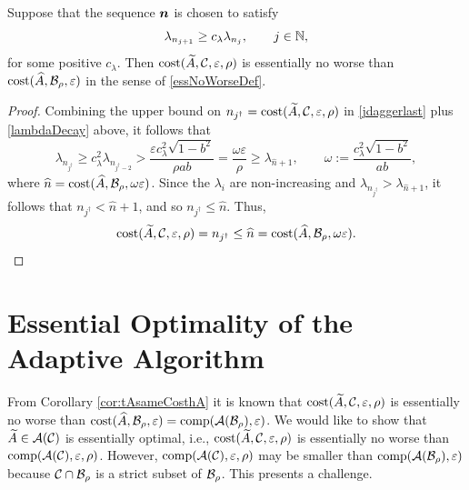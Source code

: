 \documentclass[graybox,footinfo]{svmult}
\begin{document}
\begin{corollary} \label{cor:tAsameCosthA} Suppose that the sequence ${\boldsymbol{n}}$ is chosen to satisfy
\begin{equation} \label{lambdaDecay}
\lambda_{n_{j+1}} \ge c_\lambda \lambda_{n_j}, \qquad j \in \bbN, 
\end{equation}
for some positive $c_\lambda$.  Then $\textup{cost}(\widetilde{A},{\mathcal{C}}, \varepsilon,\rho)$ is essentially no worse than \linebreak[4]
$\textup{cost}(\widehat{A},{\mathcal{B}}_{\rho},\varepsilon)$ in the sense of \eqref{essNoWorseDef}. 
\end{corollary}

\begin{proof}
Combining the upper bound on $n_{j^\dagger} = \textup{cost}(\widetilde{A},{\mathcal{C}},\varepsilon,\rho)$ in \eqref{jdaggerlast} plus  \eqref{lambdaDecay} above, it follows that
\begin{equation*}
\lambda_{n_{j^\dagger}} \ge c_{\lambda}^{2} \lambda_{n_{j^\dagger-2}} > \frac{\varepsilon c_{\lambda}^{2}\sqrt{1 - b^2}}{\rho ab } = \frac{\omega \varepsilon}{\rho} \ge \lambda_{\widehat{n}+1},
\qquad \omega := \frac{ c_{\lambda}^{2}\sqrt{1 - b^2}}{ab },
\end{equation*}
where $\widehat{n}
= \textup{cost}(\widehat{A},{\mathcal{B}}_{\rho},\omega\varepsilon )$.
Since the $\lambda_i$ are non-increasing and $\lambda_{n_{j^\dagger}} > \lambda_{\hat{n}+1}$, it follows that  $n_{j^\dagger} < \widehat{n}+1$, and so $n_{j^\dagger} \le \widehat{n}$.  Thus, 
\begin{equation*}
\textup{cost}(\widetilde{A},{\mathcal{C}},\varepsilon,\rho) = n_{j^\dagger} \le \widehat{n} = \textup{cost}(\widehat{A},{\mathcal{B}}_{\rho}, \omega \varepsilon).
\end{equation*}
\end{proof}

\section{Essential Optimality of the Adaptive Algorithm} \label{sec:opt}

From Corollary \ref{cor:tAsameCosthA} it is known that $\textup{cost}(\widetilde{A},{\mathcal{C}}, \varepsilon,\rho)$ is essentially no worse than
$\textup{cost}(\widehat{A},{\mathcal{B}}_{\rho},\varepsilon) = \textup{comp}({\mathcal{A}}({\mathcal{B}}_{\rho}),\varepsilon)$.  We would like to show that $\widetilde{A} \in {\mathcal{A}}({\mathcal{C}})$ is  essentially optimal, i.e., $\textup{cost}(\widetilde{A},{\mathcal{C}}, \varepsilon,\rho)$ is essentially no worse than  $\textup{comp}({\mathcal{A}}({\mathcal{C}}),\varepsilon,\rho)$.  However,  $\textup{comp}({\mathcal{A}}({\mathcal{C}}),\varepsilon,\rho)$ may be smaller than $\textup{comp}({\mathcal{A}}({\mathcal{B}}_{\rho}),\varepsilon)$ because ${\mathcal{C}} \cap {\mathcal{B}}_\rho$ is a strict subset of  $ {\mathcal{B}}_\rho$.  This presents a challenge.
\end{document}

